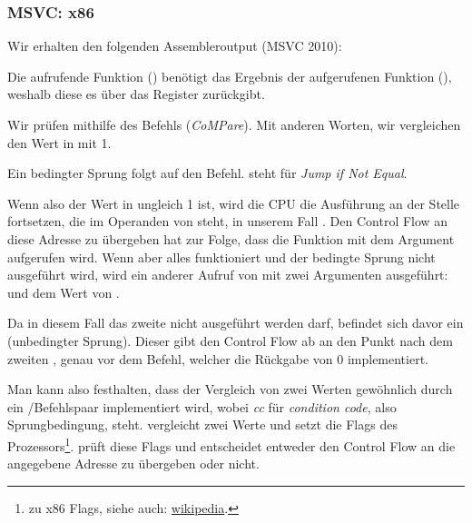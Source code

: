 \subsubsection{MSVC: x86}
Wir erhalten den folgenden Assembleroutput (MSVC 2010):



Die aufrufende Funktion (\main) benötigt das Ergebnis der aufgerufenen Funktion (\scanf), weshalb diese es über das
Register \EAX zurückgibt.

Wir prüfen mithilfe des Befehls  (\emph{CoMPare}). Mit anderen Worten, wir vergleichen den Wert in \EAX mit
1.

Ein bedingter \JNE Sprung folgt auf den \CMP Befehl. \JNE steht für \emph{Jump if Not Equal}.

Wenn also der Wert in \EAX ungleich 1 ist, wird die \ac{CPU} die Ausführung an der Stelle fortsetzen, die im Operanden
von \JNE steht, in unserem Fall .
Den Control Flow an diese Adresse zu übergeben hat zur Folge, dass die Funktion \printf mit dem Argument  aufgerufen wird.
Wenn aber alles funktioniert und der bedingte Sprung nicht ausgeführt wird, wird ein anderer Aufruf von \printf mit zwei
Argumenten ausgeführt:\\
 und dem Wert von .


Da in diesem Fall das zweite \printf nicht ausgeführt werden darf, befindet sich davor ein \JMP (unbedingter Sprung).
Dieser gibt den Control Flow ab an den Punkt nach dem zweiten \printf, genau vor dem  Befehl, welcher
die Rückgabe von 0 implementiert.

Man kann also festhalten, dass der Vergleich von zwei Werten gewöhnlich durch ein \CMP/\Jcc Befehlspaar implementiert
wird, wobei \emph{cc} für \emph{condition code}, also Sprungbedingung, steht. 
\CMP vergleicht zwei Werte und setzt die Flags des Prozessors\footnote{zu x86 Flags, siehe auch:
\href{http://go.yurichev.com/17120}{wikipedia}.}.
\Jcc prüft diese Flags und entscheidet entweder den Control Flow an die angegebene Adresse zu übergeben oder nicht.

